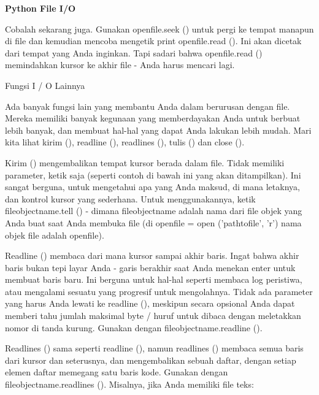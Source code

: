 \begin{center}{\fontsize{24pt}{24pt}\selectfont \textbf{Python File I/O} \\}
\vspace{12pt}
 
Cobalah sekarang juga. Gunakan openfile.seek () untuk pergi ke tempat manapun di file dan kemudian mencoba mengetik print openfile.read (). Ini akan dicetak dari tempat yang Anda inginkan. Tapi sadari bahwa openfile.read () memindahkan kursor ke akhir file - Anda harus mencari lagi. 
\vspace{14pt}

Fungsi I / O Lainnya 

\vspace{12pt}

Ada banyak fungsi lain yang membantu Anda dalam berurusan dengan file. Mereka memiliki banyak kegunaan yang memberdayakan Anda untuk berbuat lebih banyak, dan membuat hal-hal yang dapat Anda lakukan lebih mudah. Mari kita lihat kirim (), readline (), readlines (), tulis () dan close (). 

\vspace{12pt}

Kirim () mengembalikan tempat kursor berada dalam file. Tidak memiliki parameter, ketik saja (seperti contoh di bawah ini yang akan ditampilkan). Ini sangat berguna, untuk mengetahui apa yang Anda maksud, di mana letaknya, dan kontrol kursor yang sederhana. Untuk menggunakannya, ketik fileobjectname.tell () - dimana fileobjectname adalah nama dari file objek yang Anda buat saat Anda membuka file (di openfile = open ('pathtofile', 'r') nama objek file adalah openfile). 

\vspace{12pt}
 
Readline () membaca dari mana kursor sampai akhir baris. Ingat bahwa akhir baris bukan tepi layar Anda - garis berakhir saat Anda menekan enter untuk membuat baris baru. Ini berguna untuk hal-hal seperti membaca log peristiwa, atau mengalami sesuatu yang progresif untuk mengolahnya. Tidak ada parameter yang harus Anda lewati ke readline (), meskipun secara opsional Anda dapat memberi tahu jumlah maksimal byte / huruf untuk dibaca dengan meletakkan nomor di tanda kurung. Gunakan dengan fileobjectname.readline (). 

\vspace{12pt}

Readlines () sama seperti readline (), namun readlines () membaca semua baris dari kursor dan seterusnya, dan mengembalikan sebuah daftar, dengan setiap elemen daftar memegang satu baris kode. Gunakan dengan fileobjectname.readlines (). Misalnya, jika Anda memiliki file teks: 


\end{center}
